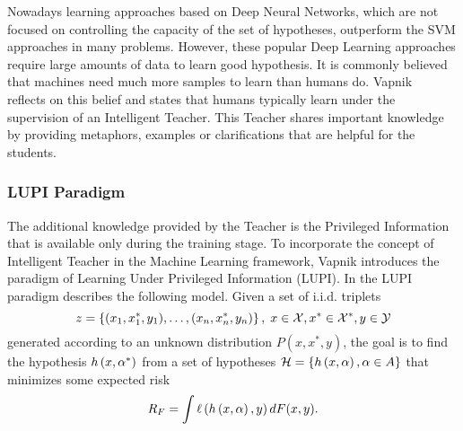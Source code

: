 Nowadays learning approaches based on Deep Neural Networks, which are not focused on controlling the capacity of the set of hypotheses, outperform the SVM approaches in many problems. However, these popular Deep Learning approaches require large amounts of data to learn good hypothesis.
It is commonly believed that machines need much more samples to learn than humans do. Vapnik~\cite{VapnikV09, VapnikI15a} reflects on this belief and states that humans typically learn under the supervision of an Intelligent Teacher.
This Teacher shares important knowledge by providing metaphors, examples or clarifications that are helpful for the students.



\subsubsection*{LUPI Paradigm}
The additional knowledge provided by the Teacher is the Privileged Information that is available only during the training stage.
To incorporate the concept of Intelligent Teacher in the Machine Learning framework, Vapnik introduces the paradigm of Learning Under Privileged Information (LUPI).
In the LUPI paradigm describes the following model. Given a set of i.i.d. triplets
$$ z = \left\{(x_1, x^*_1, y_1), \ldots, (x_n,x^*_n, y_n)\right\}, \; x \in \mathcal{X}, x^* \in \mathcal{X}^*, y \in \mathcal{Y} $$
generated according to an unknown distribution $P(x, x^*, y)$, the goal is to find the hypothesis $h\left(x, \alpha^*\right)$ from a set of hypotheses $\mathcal{H} = \left\{h\left(x, \alpha\right), \alpha \in A\right\}$ that minimizes some expected risk 
$$ R_F = \int \ell\left( h\left(x, \alpha\right), y\right) dF(x, y). $$

